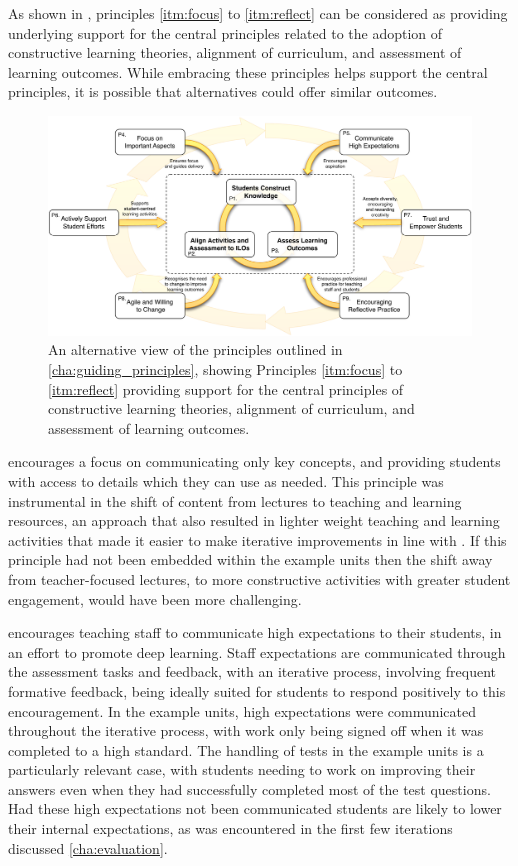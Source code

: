 As shown in , principles \ref{itm:focus} to \ref{itm:reflect} can be considered as providing underlying support for the central principles related to the adoption of constructive learning theories, alignment of curriculum, and assessment of learning outcomes. While embracing these principles helps support the central principles, it is possible that alternatives could offer similar outcomes.

\begin{figure}[htbp]
	\centering
	\includegraphics[width=\textwidth]{HowPrinciples}
	\caption{An alternative view of the principles outlined in \cref{cha:guiding_principles}, showing Principles \ref{itm:focus} to \ref{itm:reflect} providing support for the central principles of constructive learning theories, alignment of curriculum, and assessment of learning outcomes.}
	\label{fig:adjusted_how_principles}
\end{figure}

 encourages a focus on communicating only key concepts, and providing students with access to details which they can use as needed. This principle was instrumental in the shift of content from lectures to teaching and learning resources, an approach that also resulted in lighter weight teaching and learning activities that made it easier to make iterative improvements in line with . If this principle had not been embedded within the example units then the shift away from teacher-focused lectures, to more constructive activities with greater student engagement, would have been more challenging.

 encourages teaching staff to communicate high expectations to their students, in an effort to promote deep learning. Staff expectations are communicated through the assessment tasks and feedback, with an iterative process, involving frequent formative feedback, being ideally suited for students to respond positively to this encouragement. In the example units, high expectations were communicated throughout the iterative process, with work only being signed off when it was completed to a high standard. The handling of tests in the example units is a particularly relevant case, with students needing to work on improving their answers even when they had successfully completed most of the test questions. Had these high expectations not been communicated students are likely to lower their internal expectations, as was encountered in the first few iterations discussed \cref{cha:evaluation}.

